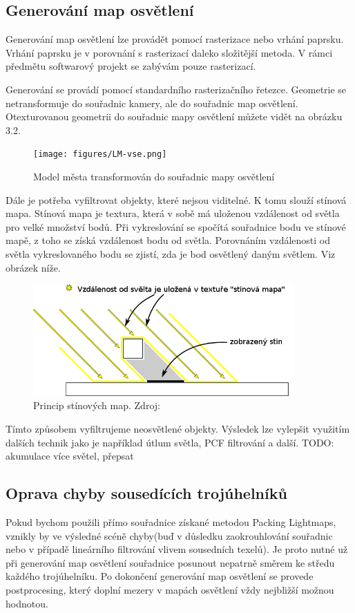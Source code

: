 \documentclass[11pt,twoside,a4paper]{book}
\begin{document}
\subsection{Generování map osvětlení}
Generování map osvětlení lze provádět pomocí rasterizace nebo vrhání paprsku. Vrhání paprsku je v porovnání s rasterizací daleko složitější metoda. V rámci předmětu softwarový projekt se zabývám pouze rasterizací.

Generování se provádí pomocí standardního rasterizačního řetezce. Geometrie se netransformuje do souřadnic kamery, ale do souřadnic map osvětlení. Otexturovanou geometrii do souřadnic mapy osvětlení můžete vidět na obrázku 3.2.
\begin{center}
\begin{figure}[h!]
\texttt{[image: figures/LM-vse.png]}
\caption{Model města transformován do souřadnic mapy osvětlení}
\end{figure}
\end{center}
\newpage

Dále je potřeba vyfiltrovat objekty, které nejsou viditelné. K tomu slouží stínová mapa. Stínová mapa je textura, která v sobě má uloženou vzdálenost od světla pro velké množství bodů. Při vykreslování se spočítá souřadnice bodu ve stínové mapě, z toho se získá vzdálenost bodu od světla. Porovnáním vzdálenosti od světla vykreslovaného bodu se zjistí, zda je bod osvětlený daným světlem. Viz obrázek níže.
\begin{center}
\begin{figure}[h!]
\includegraphics[width=100mm]{figures/shadowmapping.png}
\caption{Princip stínových map. Zdroj: \cite{Masserann11}}
\end{figure}
\end{center}

Tímto způsobem vyfiltrujeme neosvětlené objekty. Výsledek lze vylepšit využitím dalších technik jako je například útlum světla, PCF filtrování a další. TODO: akumulace více světel, přepsat

\subsection{Oprava chyby sousedících trojúhelníků}
Pokud bychom použili přímo souřadnice získané metodou Packing Lightmaps, vznikly by ve výsledné scéně chyby(buď v důsledku zaokrouhlování souřadnic nebo v případě lineárního filtrování vlivem sousedních texelů). Je proto nutné už při generování map osvětlení souřadnice posunout nepatrně směrem ke středu každého trojúhelníku. Po dokončení generování map osvětlení se provede postprocesing, který doplní mezery v mapách osvětlení vždy nejbližší možnou hodnotou.
\end{document}
